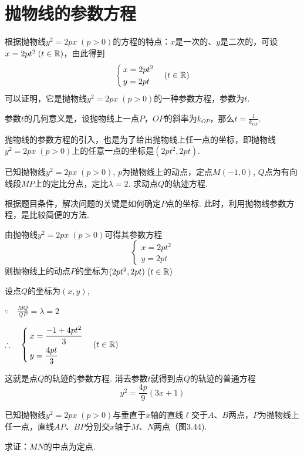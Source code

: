 \section{抛物线的参数方程}
根据抛物线$y^2=2px\; (p>0)$的方程的特点：$x$是一次的、$y$是二次的，可设$x=2pt^2\; (t\in\mathbb{R})$，由此得到
\[\begin{cases}
    x=2pt^2 \\
    y=2pt 
\end{cases}(t\in\mathbb{R})\]
可以证明，它是抛物线$y^2=2px\; (p>0)$的一种参数方程，参数为$t$.

参数$t$的几何意义是，设抛物线上一点$P$，$OP$的斜率为$k_{OP}$，那么$t=\frac{1}{k_{OP}}$.

抛物线的参数方程的引入，也是为了给出抛物线上任一点的坐标，即抛物线$y^2=2px\; (p>0)$上的任意一点的坐标是$(2pt^2,2pt)$.

\begin{example}
    已知抛物线$y^2=2px\; (p>0)$, $p$为抛物线上的动点，定点$M(-1,0)$, $Q$点为有向线段$MP$上的定比分点，定比$\lambda=2$. 求动点$Q$的轨迹方程.
\end{example}

\begin{analyze}
    根据题目条件，解决问题的关键是如何确定$P$点的坐标. 此时，利用抛物线参数方程，是比较简便的方法.
\end{analyze}

\begin{solution}
由抛物线$y^2=2px\; (p>0)$可得其参数方程
\[\begin{cases}
    x=2pt^2\\ y=2pt
\end{cases}\]
则抛物线上的动点$P$的坐标为$(2pt^2,2pt)\; (t\in\mathbb{R})$

设点$Q$的坐标为$(x,y)$,

$\because\quad \frac{MQ}{QP}=\lambda=2$

$\therefore\quad \begin{cases}
    x=\dfrac{-1+4pt^2}{3}\\[1.5ex]
    y=\dfrac{4pt}{3} 
\end{cases}(t\in\mathbb{R})$

这就是点$Q$的轨迹的参数方程. 消去参数$t$就得到点$Q$的轨迹的普通方程
\[y^2=\frac{4p}{9}(3x+1)\]
\end{solution}

\begin{example}
 已知抛物线$y^2=2px\; (p>0)$与垂直于$x$轴的直线$\ell$交于$A$、$B$两点，$P$为抛物线上任一点，直线$AP$、$BP$分别交$x$轴于$M$、$N$两点（图3.44).

求证：$MN$的中点为定点.
\end{example}

